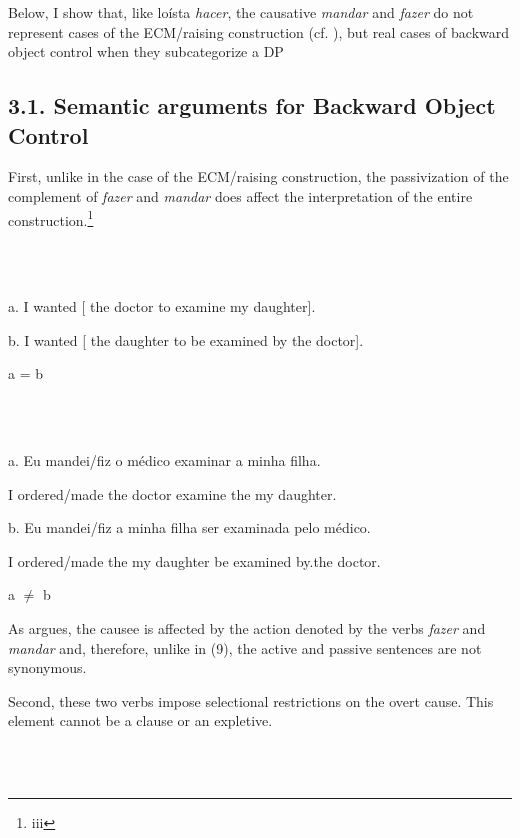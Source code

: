 \documentclass[output=paper]{langsci/langscibook}
\begin{document}
Below, I show that, like loísta \textit{hacer}, the causative \textit{mandar} and \textit{fazer} do not represent cases of the ECM/raising construction (cf. \citealt{Farrell1995}), but real cases of backward object control when they subcategorize a DP

\subsection{ 3.1. Semantic arguments for Backward Object Control} 

First, unlike in the case of the ECM/raising construction, the passivization of the complement of \textit{fazer} and \textit{mandar} does affect the interpretation of the entire construction.\footnote{iii}

\ea%
    \label{ex:moreno:9}
    \gll\\
        \\
    \glt
    \z

          a.  I wanted [ the doctor to examine my daughter].

  b.  I wanted [ the daughter to be examined by the doctor].

      a = b                \citep[119]{Farrell1995}

\ea%
    \label{ex:moreno:10}
    \gll\\
        \\
    \glt
    \z

          a.  Eu   mandei/fiz      o    médico   examinar  a    minha filha.

    I         ordered/made the doctor     examine    the my     daughter.

  b.  Eu   mandei/fiz    a     minha filha      ser examinada pelo    médico.

    I         ordered/made the  my      daughter  be examined    by.the doctor.

           a ${\neq}$ b

As \citet{Farrell1995} argues, the causee is affected by the action denoted by the verbs \textit{fazer} and \textit{mandar} and, therefore, unlike in (9), the active and passive sentences are not synonymous.

Second, these two verbs impose selectional restrictions on the overt cause. This element cannot be a clause or an expletive. 

\ea%
    \label{ex:moreno:11}
    \gll\\
        \\
    \glt
    \z
\end{document}
